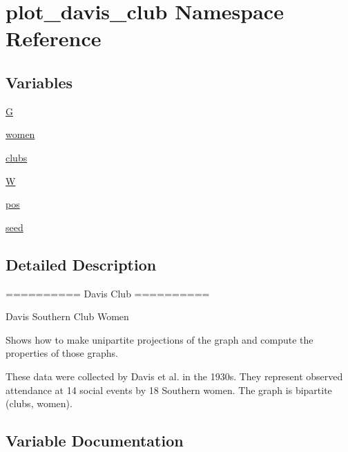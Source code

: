 \hypertarget{namespaceplot__davis__club}{}\section{plot\+\_\+davis\+\_\+club Namespace Reference}
\label{namespaceplot__davis__club}
\subsection*{Variables}
\begin{DoxyCompactItemize}
\item 
\hyperlink{namespaceplot__davis__club_ad7bff9f3e063d18a001c27dc51bd4bb1}{G}
\item 
\hyperlink{namespaceplot__davis__club_a231af121832e6abce7dc610d75563e7c}{women}
\item 
\hyperlink{namespaceplot__davis__club_a8af73e7c2bd308c6e63de21c01723893}{clubs}
\item 
\hyperlink{namespaceplot__davis__club_a85d8cd291cc6db2d14d8705df87807a2}{W}
\item 
\hyperlink{namespaceplot__davis__club_a647fdf4b443afac5a8a719a03418347b}{pos}
\item 
\hyperlink{namespaceplot__davis__club_a49268e52e7ce7b86e909299ac7554650}{seed}
\end{DoxyCompactItemize}


\subsection{Detailed Description}
\begin{DoxyVerb}==========
Davis Club
==========

Davis Southern Club Women

Shows how to make unipartite projections of the graph and compute the
properties of those graphs.

These data were collected by Davis et al. in the 1930s.
They represent observed attendance at 14 social events by 18 Southern women.
The graph is bipartite (clubs, women).
\end{DoxyVerb}
 

\subsection{Variable Documentation}
\mbox{\label{namespaceplot__davis__club_a8af73e7c2bd308c6e63de21c01723893}} 
